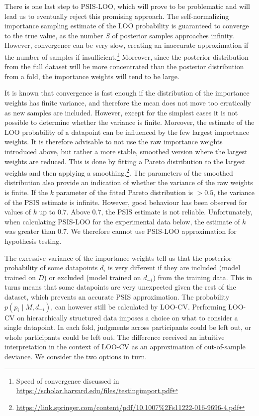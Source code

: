 \documentclass[a4paper,12pt,twoside]{article}
\begin{document}
There is one last step to PSIS-LOO, which will prove to be problematic and will lead us to eventually reject this promising approach. The self-normalizing importance sampling estimate of the LOO probability is guaranteed to converge to the true value, as the number $S$ of posterior samples approaches infinity. However, convergence can be very slow, creating an inaccurate approximation if the number of samples if insufficient.\footnote{Speed of convergence discussed in \url{https://scholar.harvard.edu/files/testingimport.pdf}} Moreover, since the posterior distribution from the full dataset will be more concentrated than the posterior distribution from a fold, the importance weights will tend to be large.

It is known that convergence is fast enough if the distribution of the importance weights has finite variance, and therefore the mean does not move too erratically as new samples are included. However, except for the simplest cases it is not possible to determine whether the variance is finite. Moreover, the estimate of the LOO probability of a datapoint can be influenced by the few largest importance weights. It is therefore advisable to not use the raw importance weights introduced above, but rather a more stable, smoothed version where the largest weights are reduced. This is done by fitting a Pareto distribution to the largest weights and then applying a smoothing.\footnote{\url{https://link.springer.com/content/pdf/10.1007\%2Fs11222-016-9696-4.pdf}}. The parameters of the smoothed distribution also provide an indication of whether the variance of the raw weights is finite. If the $k$ parameter of the fitted Pareto distribution is $> 0.5$, the variance of the PSIS estimate is infinite. However, good behaviour has been observed for values of $k$ up to 0.7. Above 0.7, the PSIS estimate is not reliable. Unfortunately, when calculating PSIS-LOO for the experimental data below, the estimate of $k$ was greater than 0.7. We therefore cannot use PSIS-LOO approximation for hypothesis testing. 

The excessive variance of the importance weights tell us that the posterior probability of some datapoints $d_i$ is very different if they are included (model trained on $D$) or excluded (model trained on $d_{-i}$) from the training data. This in turns means that some datapoints are very unexpected given the rest of the dataset, which prevents an accurate PSIS approximation. The probability $p( p_i \mid M, d_{-i})$, can however still be calculated by LOO-CV. Performing LOO-CV on hierarchically structured data imposes a choice on what to consider a single datapoint. In each fold, judgments across participants could be left out, or whole participants could be left out. The difference received an intuitive interpretation in the context of LOO-CV as an approximation of out-of-sample deviance. We consider the two options in turn.
\end{document}
